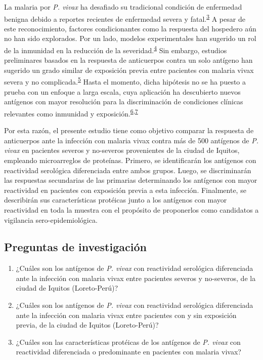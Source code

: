 \documentclass[]{article}
\begin{document}
La malaria por \emph{P. vivax} ha desafiado su tradicional condición de
enfermedad benigna debido a reportes recientes de enfermedad severa y
fatal.\textsuperscript{\protect\hyperlink{ref-quispe2014}{3}} A pesar de
este reconocimiento, factores condicionantes como la respuesta del
hospedero aún no han sido explorados. Por un lado, modelos
experimentales han sugerido un rol de la inmunidad en la reducción de la
severidad.\textsuperscript{\protect\hyperlink{ref-Moreno2013}{4}} Sin
embargo, estudios preliminares basados en la respuesta de anticuerpos
contra un solo antígeno han sugerido un grado similar de exposición
previa entre pacientes con malaria vivax severa y no
complicada.\textsuperscript{\protect\hyperlink{ref-baldevi2013}{5}}
Hasta el momento, dicha hipótesis no se ha puesto a prueba con un
enfoque a larga escala, cuya aplicación ha descubierto nuevos antígenos
con mayor resolución para la discriminación de condiciones clínicas
relevantes como inmunidad y
exposición.\textsuperscript{\protect\hyperlink{ref-crompton2010}{6},\protect\hyperlink{ref-Helb2015exposure}{7}}

Por esta razón, el presente estudio tiene como objetivo comparar la
respuesta de anticuerpos ante la infección con malaria vivax contra más
de 500 antígenos de \emph{P. vivax} en pacientes severos y no-severos
provenientes de la ciudad de Iquitos, empleando microarreglos de
proteínas. Primero, se identificarán los antígenos con reactividad
serológica diferenciada entre ambos grupos. Luego, se discriminarán las
respuestas secundarias de las primarias determinando los antígenos con
mayor reactividad en pacientes con exposición previa a esta infección.
Finalmente, se describirán sus características protéicas junto a los
antígenos con mayor reactividad en toda la muestra con el propósito de
proponerlos como candidatos a vigilancia sero-epidemiológica.

\subsection{Preguntas de
investigación}\label{preguntas-de-investigacion}

\begin{enumerate}
\def\labelenumi{\arabic{enumi}.}
\item
  ¿Cuáles son los antígenos de \emph{P. vivax} con reactividad
  serológica diferenciada ante la infección con malaria vivax entre
  pacientes severos y no-severos, de la ciudad de Iquitos (Loreto-Perú)?
\item
  ¿Cuáles son los antígenos de \emph{P. vivax} con reactividad
  serológica diferenciada ante la infección con malaria vivax entre
  pacientes con y sin exposición previa, de la ciudad de Iquitos
  (Loreto-Perú)?
\item
  ¿Cuáles son las características protéicas de los antígenos de \emph{P.
  vivax} con reactividad diferenciada o predominante en pacientes con
  malaria vivax?
\end{enumerate}
\end{document}
